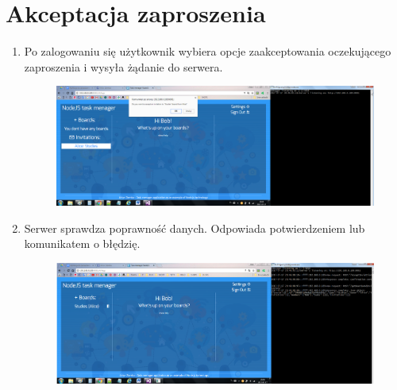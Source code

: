 \documentclass[12pt]{report}
\begin{document}
\section{Akceptacja zaproszenia}
\begin{enumerate}
\item Po zalogowaniu się użytkownik wybiera opcje zaakceptowania oczekującego zaproszenia i wysyła żądanie do serwera.
\begin{figure}[!hb]
\centering
\includegraphics[width=\textwidth,height=\textheight,keepaspectratio]{81.png}
\end{figure}
\item Serwer sprawdza poprawność danych. Odpowiada potwierdzeniem lub komunikatem o błędzię.
\begin{figure}[!hb]
\centering
\includegraphics[width=\textwidth,height=\textheight,keepaspectratio]{82.png}
\end{figure}
\end{enumerate}
\end{document}
